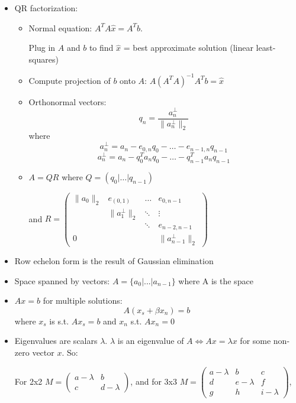 \documentclass[a4paper]{article}
\begin{document}
	\begin{itemize} 
		\item QR factorization:
    		\begin{itemize}
    			\item Normal equation: \(A^TA\hat{x}=A^Tb\).
                
                Plug in \(A\) and \(b\) to find \(\hat{x}\) = best approximate solution (linear least-squares) 
				\item Compute projection of \( b \) onto \(A\): \(A(A^TA)^{−1}A^Tb=\hat{x}\)
				\item Orthonormal vectors: $$q_n=\frac{a^{\bot }_n}{\parallel a^{\bot }_n \parallel _2}$$ where
					$$a^\bot _n = a_n − e_{0,n}q_0− \dots −e_{n−1,n}q_{n−1}$$
					$$a^\bot _n=a_n−q^T_0a_nq_0−\dots −q^T_{n−1}a_nq_{n−1}$$
                \item \(A=QR\) where \(Q=(q_0 | \dots | q_{n-1})\)
                
                and \(R=
                	\begin{pmatrix}
                    	\parallel a_0 \parallel _2 & e_(0,1) & \dots & e_{0,n-1} \\
                        & \parallel a_1^{\bot } \parallel _2 & \ddots & \vdots \\
                        & & \ddots & e_{n-2,n-1} \\
                        0 & & & \parallel a^{\bot }_{n-1} \parallel _2
                    \end{pmatrix}
                \)
			\end{itemize}
		\item Row echelon form is the result of Gaussian elimination
		\item Space spanned by vectors: \(A=\{ a_0|\text{...}|a_{n−1}\} \) where A is the space
		\item \(Ax=b\) for multiple solutions: $$A(x_s+\beta x_n)=b$$ where \(x_s\) is s.t. \(Ax_s=b\) and \(x_n\) s.t. \(Ax_n=0\)
        \item Eigenvalues are scalars \(\lambda \). \(\lambda\) is an eigenvalue of \(A \iff Ax = \lambda x\) for some non-zero vector \(x\). So:
        
        	For 2x2 \(M =
                \begin{pmatrix}
                    a-\lambda & b \\
                    c & d-\lambda 
                \end{pmatrix}\), and for 3x3 \( M =
                \begin{pmatrix}
                    a-\lambda & b & c \\
                    d & e-\lambda & f \\
                    g & h & i-\lambda 
                \end{pmatrix} \),
                

\end{itemize}
\end{document}

